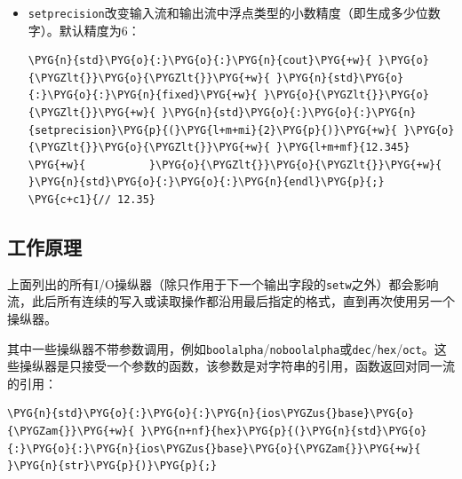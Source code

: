 \begin{itemize}

\item \texttt{setprecision}改变输入流和输出流中浮点类型的小数精度（即生成多少位数字）。默认精度为6：



\begin{codeblockbg}
\begin{Verbatim}[commandchars=\\\{\},breaklines=true,breakanywhere=true,fontsize=\codefont,xleftmargin=17bp]
\PYG{n}{std}\PYG{o}{:}\PYG{o}{:}\PYG{n}{cout}\PYG{+w}{ }\PYG{o}{\PYGZlt{}}\PYG{o}{\PYGZlt{}}\PYG{+w}{ }\PYG{n}{std}\PYG{o}{:}\PYG{o}{:}\PYG{n}{fixed}\PYG{+w}{ }\PYG{o}{\PYGZlt{}}\PYG{o}{\PYGZlt{}}\PYG{+w}{ }\PYG{n}{std}\PYG{o}{:}\PYG{o}{:}\PYG{n}{setprecision}\PYG{p}{(}\PYG{l+m+mi}{2}\PYG{p}{)}\PYG{+w}{ }\PYG{o}{\PYGZlt{}}\PYG{o}{\PYGZlt{}}\PYG{+w}{ }\PYG{l+m+mf}{12.345}
\PYG{+w}{          }\PYG{o}{\PYGZlt{}}\PYG{o}{\PYGZlt{}}\PYG{+w}{ }\PYG{n}{std}\PYG{o}{:}\PYG{o}{:}\PYG{n}{endl}\PYG{p}{;}
\PYG{c+c1}{// 12.35}
\end{Verbatim}
\end{codeblockbg}

\end{itemize}



\subsection{工作原理}



上面列出的所有I/O操纵器（除只作用于下一个输出字段的\texttt{setw}之外）都会影响流，此后所有连续的写入或读取操作都沿用最后指定的格式，直到再次使用另一个操纵器。



其中一些操纵器不带参数调用，例如\texttt{boolalpha}/\texttt{noboolalpha}或\texttt{dec}/\texttt{hex}/\texttt{oct}。这些操纵器是只接受一个参数的函数，该参数是对字符串的引用，函数返回对同一流的引用：



\begin{codeblockbg}
\begin{Verbatim}[commandchars=\\\{\},breaklines=true,breakanywhere=true,fontsize=\codefont,xleftmargin=17bp]
\PYG{n}{std}\PYG{o}{:}\PYG{o}{:}\PYG{n}{ios\PYGZus{}base}\PYG{o}{\PYGZam{}}\PYG{+w}{ }\PYG{n+nf}{hex}\PYG{p}{(}\PYG{n}{std}\PYG{o}{:}\PYG{o}{:}\PYG{n}{ios\PYGZus{}base}\PYG{o}{\PYGZam{}}\PYG{+w}{ }\PYG{n}{str}\PYG{p}{)}\PYG{p}{;}
\end{Verbatim}
\end{codeblockbg}


